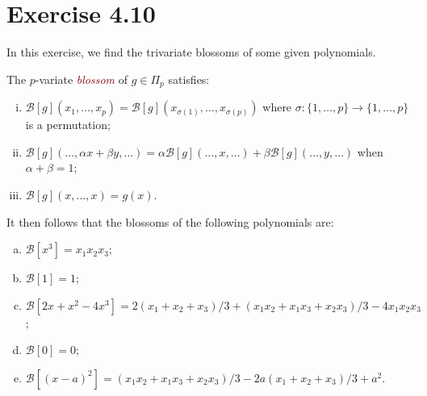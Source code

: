 \documentclass{article}
\newcommand{\B}{\mathcal{B}}
\let\oldemph\emph
\renewcommand{\emph}[1]{\textcolor{Maroon}{\oldemph{#1}}}
\begin{document}
    \section*{Exercise 4.10}
    
    In this exercise, we find the trivariate blossoms of some given
    polynomials.

    \begin{recall}
        The $p$-variate \emph{blossom} of $g \in \Pi_p$ satisfies:
        \begin{enumerate}[i)]
            \item $\B[g](x_1, \ldots, x_p) = \B[g](x_{\sigma(1)}, \ldots,
                x_{\sigma(p)})$ where $\sigma \colon \{1, \ldots, p\} \to \{1,
                \ldots, p\}$ is a permutation;
            \item $\B[g](\ldots, \alpha x + \beta y, \ldots) = \alpha
                    \B[g](\ldots, x, \ldots) + \beta\B[g](\ldots, y, \ldots)$
                    when $\alpha + \beta = 1$;
                \item $\B[g](x, \ldots, x) = g(x).$
        \end{enumerate}
    \end{recall}
    It then follows that the blossoms of the following polynomials are:
    \begin{enumerate}[a)]
        \item $\B[x^3] = x_1 x_2 x_3$;
        \item $\B[1] = 1$;
        \item $\B[2x + x^2 - 4x^3] = 2 (x_1 + x_2 + x_3)/3 + (x_1x_2 + x_1x_3 +
            x_2x_3)/3 - 4x_1x_2x_3$;
        \item $\B[0] = 0$;
        \item $\B[(x-a)^2] = (x_1x_2 + x_1x_3 + x_2x_3) / 3 - 2a (x_1 + x_2 +
            x_3) / 3 + a^2$.
    \end{enumerate}
    
\end{document}
